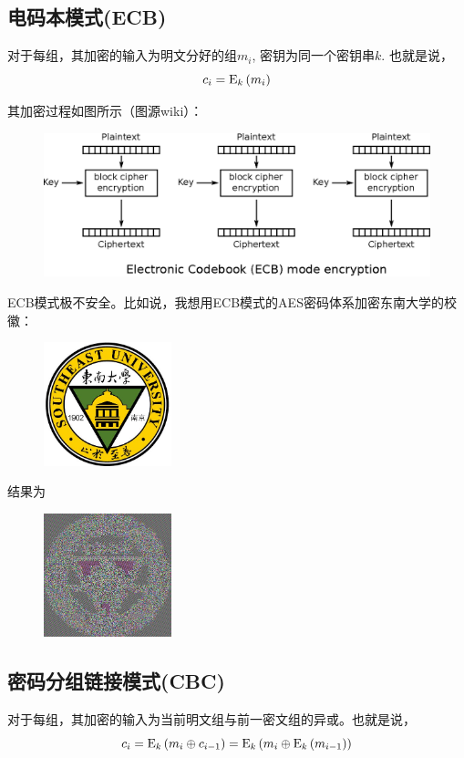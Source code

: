 \subsection{电码本模式(ECB)}
对于每组，其加密的输入为明文分好的组$m_i$, 密钥为同一个密钥串$k$. 也就是说，
\begin{equation}
c_i={\mathrm{E}_{k}\left({m_i}\right)}
\end{equation}

其加密过程如图所示（图源wiki）：
\begin{figure}[H]
\centering
\includegraphics[scale=1]{chapters/chapter_3/ECB.eps}
\end{figure}

ECB模式极不安全。比如说，我想用ECB模式的AES密码体系加密东南大学的校徽：
\begin{figure}[H]
\centering
\includegraphics[width=10em]{chapters/chapter_3/ECB_origin.jpg}
\end{figure}

结果为
\begin{figure}[H]
\centering
\includegraphics[width=10em]{chapters/chapter_3/ECB_result.jpg}
\end{figure}
\subsection{密码分组链接模式(CBC)}
对于每组，其加密的输入为当前明文组与前一密文组的异或。也就是说，
\begin{equation}
c_i={\mathrm{E}_{k}\left({m_i\oplus c_{i-1}}\right)}={\mathrm{E}_{k}\left({m_i\oplus {\mathrm{E}_{k}\left({m_{i-1}}\right)}}\right)}
\end{equation}

